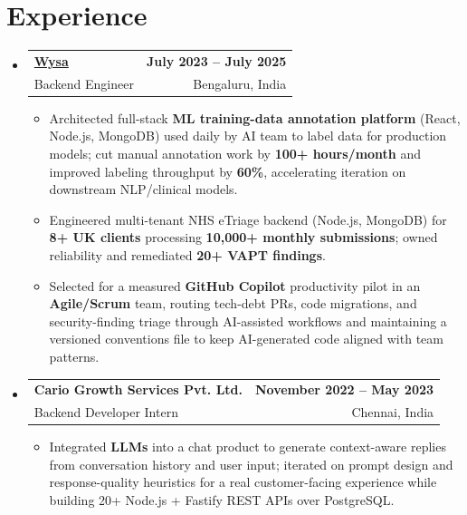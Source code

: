 \documentclass[letterpaper,10pt]{article}
\makeatletter
\newcommand{\resumeItem}[1]{
  \item\small{#1\vspace{-1pt}}
}
\newcommand{\resumeSubheading}[4]{
  \vspace{1pt}\item
    \begin{tabular*}{0.985\textwidth}[t]{l@{\extracolsep{\fill}}r}
      \textbf{#1} & \textbf{\small #2} \\
      {\small\color{ResumeSlate} #3} & {\small\color{ResumeSlate} #4} \\
    \end{tabular*}\vspace{-6pt}
}
\newcommand{\resumeSubHeadingListStart}{\begin{itemize}[leftmargin=0.0in, label={}, itemsep=2pt, topsep=2pt]}
\newcommand{\resumeSubHeadingListEnd}{\end{itemize}}
\newcommand{\resumeItemListStart}{\begin{itemize}[leftmargin=0.18in, itemsep=2pt, topsep=1pt]}
\newcommand{\resumeItemListEnd}{\end{itemize}\vspace{-4pt}}
\makeatother
\begin{document}
\section{Experience}
\resumeSubHeadingListStart
  \resumeSubheading
    {\href{https://www.wysa.io}{Wysa}}{July 2023 -- July 2025}
    {Backend Engineer}{Bengaluru, India}
    \resumeItemListStart
      \resumeItem{Architected full-stack \textbf{ML training-data annotation platform} (React, Node.js, MongoDB) used daily by AI team to label data for production models; cut manual annotation work by \textbf{100+ hours/month} and improved labeling throughput by \textbf{60\%}, accelerating iteration on downstream NLP/clinical models.}
      \resumeItem{Engineered multi-tenant NHS eTriage backend (Node.js, MongoDB) for \textbf{8+ UK clients} processing \textbf{10{,}000+ monthly submissions}; owned reliability and remediated \textbf{20+ VAPT findings}.}
      \resumeItem{Selected for a measured \textbf{GitHub Copilot} productivity pilot in an \textbf{Agile/Scrum} team, routing tech-debt PRs, code migrations, and security-finding triage through AI-assisted workflows and maintaining a versioned conventions file to keep AI-generated code aligned with team patterns.}
    \resumeItemListEnd
  \resumeSubheading
    {Cario Growth Services Pvt. Ltd.}{November 2022 -- May 2023}
    {Backend Developer Intern}{Chennai, India}
    \resumeItemListStart
      \resumeItem{Integrated \textbf{LLMs} into a chat product to generate context-aware replies from conversation history and user input; iterated on prompt design and response-quality heuristics for a real customer-facing experience while building 20+ Node.js + Fastify REST APIs over PostgreSQL.}
    \resumeItemListEnd
\resumeSubHeadingListEnd
\vspace{-4pt}
\end{document}
